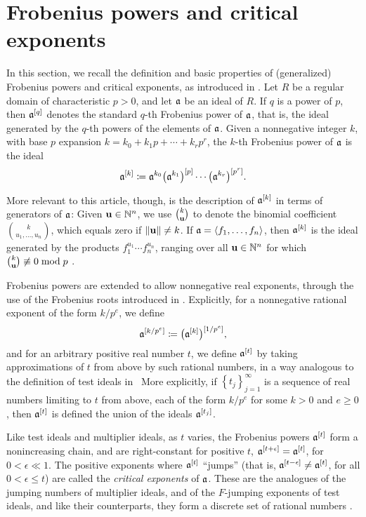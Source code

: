 \documentclass[11pt]{amsart}
\begin{document}
\newpage
\section{Frobenius powers and critical exponents}


In this section, we recall the definition and basic properties of (generalized) Frobenius powers and critical exponents, as introduced in \cite{hernandez+etal.frobenius_powers}.
Let $R$ be a regular domain of characteristic $p > 0$, and let $\mathfrak{a}$ be an ideal of $R$.
If $q$ is a power of $p$, then $\mathfrak{a}^{[q]}$ denotes the standard $q$-th Frobenius power of $\mathfrak{a}$, that is, the ideal generated by the $q$-th powers of the elements of $\mathfrak{a}$.
Given a nonnegative integer $k$, with base $p$ expansion $k = k_0 + k_1 p + \cdots + k_r p^r$, the $k$-th Frobenius power of $\mathfrak{a}$ is the ideal
\[\mathfrak{a}^{[k]} \coloneqq \mathfrak{a}^{k_0}\big(\mathfrak{a}^{k_1}\big)^{[p]}\cdots \big(\mathfrak{a}^{k_r}\big)^{[p^r]}.\]


More relevant to this article, though, is the description of $\mathfrak{a}^{[k]}$ in terms of generators of $\mathfrak{a}$:
Given $\mathbf{u} \in \mathbb{N}^n$, we use
$\binom{k}{\mathbf{u}}$ to denote the binomial coefficient $\binom{k}{u_1,\ldots,u_n}$, which equals zero if $\| \mathbf{u} \| \neq k$.
If $\mathfrak{a} = \langle f_1,\ldots,f_n \rangle$, then $\mathfrak{a}^{[k]}$ is the ideal generated by the products $f_1^{u_1}\cdots f_n^{u_n}$, ranging over all $\mathbf{u} \in \mathbb{N}^n$ for which $\binom{k}{\mathbf{u}}\not\equiv 0\bmod{p}$ \cite[Proposition~3.5]{hernandez+etal.frobenius_powers}.


Frobenius powers are extended to allow nonnegative real exponents, through the use of the Frobenius roots introduced in \cite{blickle+mustata+smith.discr_rat_FPTs}.
Explicitly, for a nonnegative rational exponent of the form $k/p^e$, we define
\[\mathfrak{a}^{[k/p^e]} \coloneqq \big(\mathfrak{a}^{[k]}\big)^{[1/p^e]},\]
and for an arbitrary positive real number $t$, we define $\mathfrak{a}^{[t]}$ by taking approximations of $t$ from above by such rational numbers, in a way analogous to the definition of test ideals in \loccit\
More explicitly, if $\left\{t_j\right\}_{j=1}^\infty$ is a sequence of real numbers limiting to $t$ from above, each of the form $k/p^e$ for some $k>0$ and $e \geq 0$, then $\mathfrak{a}^{[t]}$ is defined the union of the ideals $\mathfrak{a}^{[t_j]}$.

Like test ideals and multiplier ideals, as $t$ varies, the Frobenius powers $\mathfrak{a}^{[t]}$ form a nonincreasing chain, and are right-constant for positive $t$, \ie $\mathfrak{a}^{[t+\epsilon]} = \mathfrak{a}^{[t]}$, for $0<\epsilon \ll 1$.
The positive exponents where $\mathfrak{a}^{[t]}$ ``jumps'' (that is, $\mathfrak{a}^{[t-\epsilon]}\ne \mathfrak{a}^{[t]}$, for all $0<\epsilon \le t$) are called the \emph{critical exponents} of $\mathfrak{a}$.
These are the analogues of the jumping numbers of multiplier ideals, and of the $F$-jumping exponents of test ideals, and like their counterparts, they form a discrete set of rational numbers \cite[Corollary~5.8]{hernandez+etal.frobenius_powers}.
\end{document}
